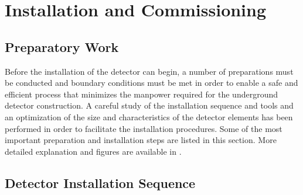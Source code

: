 \section{Installation and Commissioning}
\label{sec:detectors-fd-alt-install}

\subsection{Preparatory Work}

Before the installation of the detector can begin, a number of
preparations must be conducted and boundary conditions must be met in
order to enable a safe and efficient process that minimizes the
manpower required for the underground detector construction. A careful
study of the installation sequence and tools and an optimization of
the size and characteristics of the detector elements has been
performed in order to facilitate the installation procedures. Some of the
most important preparation and installation steps are listed in this
section. More detailed explanation and figures are available in
\anxlbnob.

\subsection{Detector Installation Sequence}

